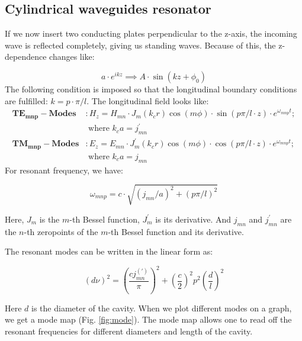 \documentclass[a4paper]{report}
\numberwithin{equation}{section}
\begin{document}
\subsection{Cylindrical waveguides resonator}
If we now insert two conducting plates perpendicular to the z-axis, the incoming wave is reflected
completely, giving us standing waves. Because of this, the z-dependence changes
like: 

\[
		a \cdot e^{ikz} \implies A \cdot \sin\left(kz + \phi_{0}\right)    
\]
The following condition is imposed so that the longitudinal boundary conditions
are fulfilled: $k = p\cdot \pi /l $. The longitudinal field looks like: 
\begin{align*}
		\mathbf{TE_{mnp}-Modes}&: H_{z} = H_{mn}\cdot J_{m} \left(k_{c}r \right) \cos\left(m \phi \right) \cdot \sin\left(p \pi / l \cdot z \right) \cdot e^{\omega_{mnp}t}; \\  &\text{ where } k_{c}a=j_{mn}^{'}  \\
		\mathbf{TM_{mnp}-Modes}&: E_{z} = E_{mn}\cdot J_{m}^{'}  \left(k_{c}r \right) \cos\left(m \phi \right) \cdot \cos\left(p \pi / l \cdot z \right) \cdot e^{\omega_{mnp}t}; \\  &\text{ where } k_{c}a=j_{mn} 
\end{align*}
For resonant frequency, we have:

\[
		\omega_{mnp} = c \cdot \sqrt{\left(j_{mn}/a\right)^2 + \left(p \pi / l\right)^2} 
\]

Here, $J_{m}$ is the $m$-th Bessel function, $J_{m}^{'} $ is its derivative. And
$j_{mn}$ and $j_{mn}^{'}$ are the $n$-th zeropoints of the $m$-th Bessel
function and its derivative.

The resonant modes can be written in the linear form as:

\begin{equation} \label{eqn:res_freq}
		\left(d \nu \right)^2 = \left(\frac{cj_{mn}^{(')}}{\pi}\right)^2 + \left(\frac{c}{2}\right)^2 p^2 \left(\frac{d}{l}\right)^2
\end{equation}

Here $d$ is the diameter of the cavity. When we plot different modes on a graph,
we get a mode map (Fig. \ref{fig:mode}). The mode map allows one to read off the
resonant frequencies for different diameters and length of the cavity. 
\end{document}
